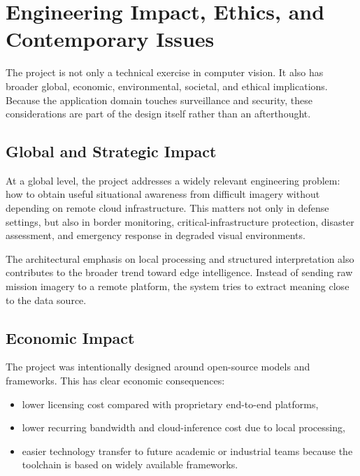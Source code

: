 \section{Engineering Impact, Ethics, and Contemporary Issues}
\label{sec:impact}

The project is not only a technical exercise in computer vision. It also has broader global,
economic, environmental, societal, and ethical implications. Because the application domain
touches surveillance and security, these considerations are part of the design itself rather than
an afterthought.

\subsection{Global and Strategic Impact}

At a global level, the project addresses a widely relevant engineering problem: how to obtain
useful situational awareness from difficult imagery without depending on remote cloud
infrastructure. This matters not only in defense settings, but also in border monitoring,
critical-infrastructure protection, disaster assessment, and emergency response in degraded
visual environments.

The architectural emphasis on local processing and structured interpretation also contributes to
the broader trend toward edge intelligence. Instead of sending raw mission imagery to a
remote platform, the system tries to extract meaning close to the data source.

\subsection{Economic Impact}

The project was intentionally designed around open-source models and frameworks. This has
clear economic consequences:

\begin{itemize}[nosep]
  \item lower licensing cost compared with proprietary end-to-end platforms,
  \item lower recurring bandwidth and cloud-inference cost due to local processing,
  \item easier technology transfer to future academic or industrial teams because the toolchain
    is based on widely available frameworks.
\end{itemize}

